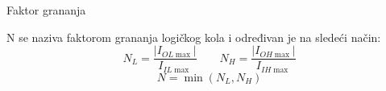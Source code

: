 \begin{frame}[label=08-s032]{Faktor grananja}
\centering\par\medskip
N se naziva faktorom grananja logičkog kola i određivan je na sledeći način:
\[N_L=\frac{|I_{OL\max}|}{I_{IL\max}}\qquad N_H=\frac{|I_{OH\max}|}{I_{IH\max}}\]
\[N=\min(N_L,N_H)\]
\end{frame}
